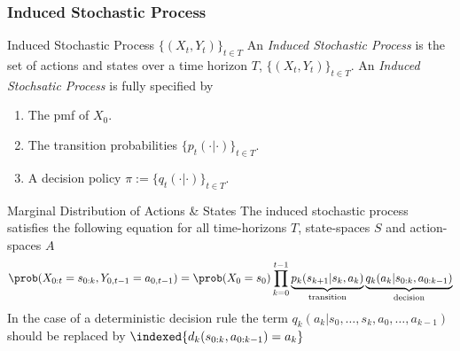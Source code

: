 \documentclass[11pt,a4paper]{article}
\begin{document}
\subsubsection{Induced Stochastic Process}

  \begin{definition}{Induced Stochastic Process $\{(X_t,Y_t)\}_{t\in T}$}
    An \textit{Induced Stochastic Process} is the set of actions and states over a time horizon $T$, $\{(X_t,Y_t)\}_{t\in T}$. An \textit{Induced Stochsatic Process} is fully specified by
    \begin{enumerate}
      \item The pmf of $X_0$.
      \item The transition probabilities $\{p_t(\cdot|\cdot)\}_{t\in T}$.
      \item A decision policy $\pi:=\{q_t(\cdot|\cdot)\}_{t\in T}$.
    \end{enumerate}
  \end{definition}

  \begin{theorem}{Marginal Distribution of Actions \& States}
    The induced stochastic process satisfies the following equation for all time-horizons $T$, state-spaces $S$ and action-spaces $A$
    \[ \prob(X_{0:t}=s_{0:k},Y_{0,t-1}=a_{0,t-1})=\prob(X_0=s_0)\prod_{k=0}^{t-1}\underbrace{p_k(s_{k+1}|s_k,a_k)}_\text{transition}\underbrace{q_k(a_k|s_{0:k},a_{0:k-1})}_\text{decision} \]
    In the case of a deterministic decision rule the term $q_k(a_k|s_0,\dots,s_k,a_0,\dots,a_{k-1})$ should be replaced by $\indexed\{d_k(s_{0:k},a_{0:k-1})=a_k\}$
  \end{theorem}
\end{document}
